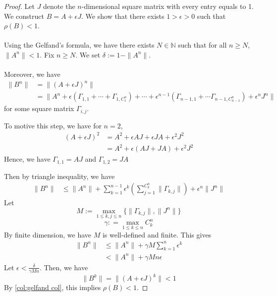 \begin{proof}
    Let $J$ denote the $n$-dimensional square matrix with every entry equals to 1. We construct $B = A +\epsilon  J$. We show that there exists $1>\epsilon>0$ such that $\rho(B)<1$.\\
    \\
    Using the Gelfand's formula, we have there exists $N\in\mathbb{N}$ such that for all $n\ge N$, $\|A^n\|< 1$. Fix $n\ge N$. We set $\delta:= 1-\|A^n\|$.\\
    \\
    Moreover, we have 
    \begin{align*}
        \|B^n\| &= \|(A+\epsilon J)^n\|\\
        &= \|A^n +  \epsilon (\Gamma_{1,1} +\cdots + \Gamma_{1,C^n_1})+\cdots +  \epsilon^{n-1}(\Gamma_{n-1, 1} + \cdots \Gamma_{n-1, C^{n}_{n-1}}) +\epsilon^n J^n\|
    \end{align*}
    for some square matrix $\Gamma_{i,j}$. 
    \begin{remark}
    To motive this step, we have for $n=2$,
    \begin{align*}
        (A + \epsilon J)^2  &= A^2 + \epsilon AJ + \epsilon J A + \epsilon^2 J^2\\
        &= A^2 + \epsilon (AJ +JA) +\epsilon ^2 J^2
    \end{align*}
    Hence, we have $\Gamma_{1,1} = AJ$ and $\Gamma_{1,2} = JA$
\end{remark}
    \noindent Then by triangle inequality, we have
    \begin{align*}
         \|B^n\| &\le \|A^n\| + \sum_{k=1}^{n-1} \epsilon^k \left(\sum_{j=1}^{C^n_k} \|\Gamma_{k,j}\|\right) + \epsilon^n \|J^n\|
    \end{align*}
    Let 
    $$
    M:=\max_{1\le k,j\le n}\{\|\Gamma_{k,j}\|, \|J^n\|\}
    $$
    $$
    \gamma: =\max_{1\le k\le n} C^n_k
    $$
    By finite dimension, we have $M$ is well-defined and finite. This gives
   \begin{align*}
         \|B^n\| &\le \|A^n\| + \gamma M\sum_{k=1}^{n} \epsilon^k\\
         &<\|A^n\| + \gamma M n\epsilon \tag{$0<\epsilon<1$}
    \end{align*}
    Let $\epsilon <\frac{\delta}{\gamma Mn}$. Then, we have
    $$
    \|B^k\| = \|(A+\epsilon J)^k\|< 1
    $$
    By \autoref{col:gelfand col}, this implies $\rho(B)<1$.
\end{proof}


